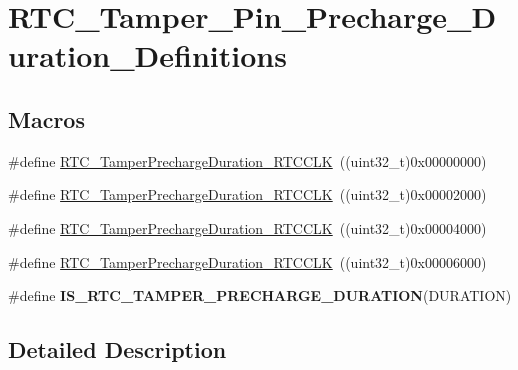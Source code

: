 \hypertarget{group___r_t_c___tamper___pin___precharge___duration___definitions}{\section{R\-T\-C\-\_\-\-Tamper\-\_\-\-Pin\-\_\-\-Precharge\-\_\-\-Duration\-\_\-\-Definitions}
\label{group___r_t_c___tamper___pin___precharge___duration___definitions}
}
\subsection*{Macros}
\begin{DoxyCompactItemize}
\item 
\#define \hyperlink{group___r_t_c___tamper___pin___precharge___duration___definitions_ga776e4f1a1a30d81e4333462ff49b10d6}{R\-T\-C\-\_\-\-Tamper\-Precharge\-Duration\-\_\-R\-T\-C\-C\-L\-K}~((uint32\-\_\-t)0x00000000)
\item 
\#define \hyperlink{group___r_t_c___tamper___pin___precharge___duration___definitions_gacd4ef118bfdfad143f4ca228c7a2dccb}{R\-T\-C\-\_\-\-Tamper\-Precharge\-Duration\-\_\-R\-T\-C\-C\-L\-K}~((uint32\-\_\-t)0x00002000)
\item 
\#define \hyperlink{group___r_t_c___tamper___pin___precharge___duration___definitions_gaaad3b9cb77e5218cc271e68b2f5e6b44}{R\-T\-C\-\_\-\-Tamper\-Precharge\-Duration\-\_\-R\-T\-C\-C\-L\-K}~((uint32\-\_\-t)0x00004000)
\item 
\#define \hyperlink{group___r_t_c___tamper___pin___precharge___duration___definitions_ga5b5b8e47db4271d3ab7e8ca16dbb645c}{R\-T\-C\-\_\-\-Tamper\-Precharge\-Duration\-\_\-R\-T\-C\-C\-L\-K}~((uint32\-\_\-t)0x00006000)
\item 
\#define {\bfseries I\-S\-\_\-\-R\-T\-C\-\_\-\-T\-A\-M\-P\-E\-R\-\_\-\-P\-R\-E\-C\-H\-A\-R\-G\-E\-\_\-\-D\-U\-R\-A\-T\-I\-O\-N}(D\-U\-R\-A\-T\-I\-O\-N)
\end{DoxyCompactItemize}


\subsection{Detailed Description}


